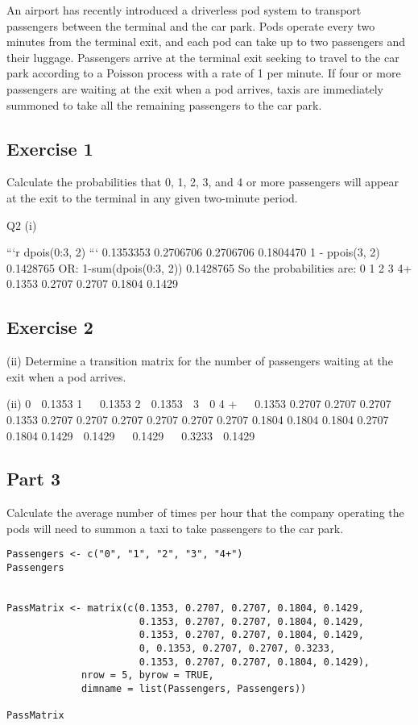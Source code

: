 \documentclass[a4paper,12pt]{article}
\begin{document}
\large 
\noindent An airport has recently introduced a driverless pod system to transport passengers
between the terminal and the car park. Pods operate every two minutes from
the terminal exit, and each pod can take up to two passengers and their luggage.
Passengers arrive at the terminal exit seeking to travel to the car park according to a
Poisson process with a rate of 1 per minute.
If four or more passengers are waiting at the exit when a pod arrives, taxis are
immediately summoned to take all the remaining passengers to the car park.

\subsection*{Exercise 1}
\noindent Calculate the probabilities that 0, 1, 2, 3, and 4 or more passengers will appear
at the exit to the terminal in any given two-minute period.




Q2
(i)

```{r}
dpois(0:3, 2)
```
 0.1353353 0.2706706 0.2706706 0.1804470
1 - ppois(3, 2)
 0.1428765
OR:
1-sum(dpois(0:3, 2))
 0.1428765
So the probabilities are:
0
1
2
3
4+
0.1353
0.2707
0.2707
0.1804
0.1429


\subsection*{Exercise 2}
(ii) Determine a transition matrix for the number of passengers waiting at the exit
when a pod arrives.



(ii)
0  0.1353
1   0.1353
2  0.1353

3  0
4 +   0.1353
0.2707
0.2707
0.2707
0.1353
0.2707
0.2707
0.2707
0.2707
0.2707
0.2707
0.1804
0.1804
0.1804
0.2707
0.1804
0.1429 
0.1429  
0.1429 

0.3233 
0.1429  


\newpage 
\subsection*{Part 3}
Calculate the average number of times per hour that the company operating the pods will need to summon a taxi to take passengers to the car park.
\begin{framed}
\begin{verbatim}
Passengers <- c("0", "1", "2", "3", "4+")
Passengers


PassMatrix <- matrix(c(0.1353, 0.2707, 0.2707, 0.1804, 0.1429, 
                       0.1353, 0.2707, 0.2707, 0.1804, 0.1429, 
                       0.1353, 0.2707, 0.2707, 0.1804, 0.1429, 
                       0, 0.1353, 0.2707, 0.2707, 0.3233, 
                       0.1353, 0.2707, 0.2707, 0.1804, 0.1429),
             nrow = 5, byrow = TRUE, 
             dimname = list(Passengers, Passengers))

PassMatrix
\end{verbatim}
\end{framed}
\end{document}
